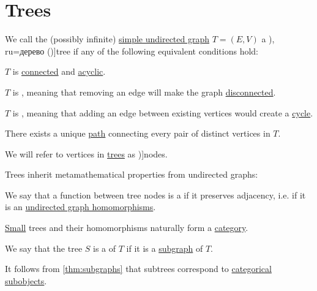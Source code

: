 \section{Trees}\label{sec:trees}

\begin{definition}\label{def:tree}
  We call the (possibly infinite) \hyperref[def:undirected_graph]{simple undirected graph} \( T = (E, V) \) a \term[bg=дърво (\cite[21]{Мирчев2001Графи}), ru=дерево (\cite[53]{ЕмеличевИПр1990ТеорияГрафов})]{tree} if any of the following equivalent conditions hold:
  \begin{thmenum}[series=def:tree]
     \( T \) is \hyperref[def:graph_connectedness/undirected]{connected} and \hyperref[def:acyclic_graph]{acyclic}.

     \( T \) is , meaning that removing an edge will make the graph \hyperref[def:graph_connectedness/undirected]{disconnected}.

     \( T \) is , meaning that adding an edge between existing vertices would create a \hyperref[def:graph_cycle]{cycle}.

     There exists a unique \hyperref[def:graph_walk/path]{path} connecting every pair of distinct vertices in \( T \).
  \end{thmenum}

  We will refer to vertices in \hyperref[def:tree]{trees} as \term[en=node (\cite[190]{Erickson2019Algorithms})]{nodes}.

  Trees inherit metamathematical properties from undirected graphs:
  \begin{thmenum}[resume=def:tree]
    \mimprovised We say that a function between tree nodes is a  if it preserves adjacency, i.e. if it is an \hyperref[def:undirected_graph/morphism]{undirected graph homomorphisms}.

     \hyperref[def:small_set]{Small} trees and their homomorphisms naturally form a \hyperref[def:category]{category}.

     We say that the tree \( S \) is a  of \( T \) if it is a \hyperref[def:undirected_graph/subobject]{subgraph} of \( T \).

    It follows from \cref{thm:subgraphs} that subtrees correspond to \hyperref[def:categorical_subobject]{categorical subobjects}.
  \end{thmenum}
\end{definition}
